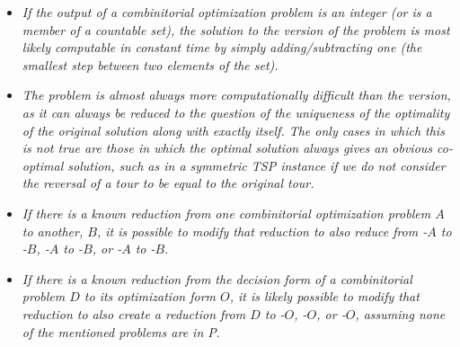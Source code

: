 \begin{itemize}
    \item \textit{If the output of a combinitorial optimization problem is an integer (or is a member of a countable set), the solution to the \exob{} version of the problem is most likely computable in constant time by simply adding/subtracting one (the smallest step between two elements of the set).}
    \item \textit{The \inob{} problem is almost always more computationally difficult than the \exob{} version, as it can always be reduced to the question of the uniqueness of the optimality of the original solution along with exactly \exob{} itself. The only cases in which this is not true are those in which the optimal solution always gives an obvious co-optimal solution, such as in a symmetric TSP instance if we do not consider the reversal of a tour to be equal to the original tour.}
    \item \textit{If there is a known reduction from one combinitorial optimization problem $A$ to another, $B$, it is possible to modify that reduction to also reduce from \inob{}-$A$ to \inob{}-$B$, \exob{}-$A$ to \exob{}-$B$, or \exb{}-$A$ to \exb{}-$B$}.
    \item \textit{If there is a known reduction from the decision form of a combinitorial problem $D$ to its optimization form $O$, it is likely possible to modify that reduction to also create a reduction from $D$ to \inob{}-$O$, \exob{}-$O$, or \exb{}-$O$, assuming none of the mentioned problems are in P}.
\end{itemize}
